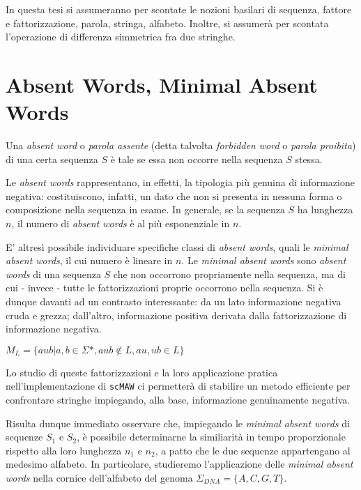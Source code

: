 In questa tesi si assumeranno per scontate le nozioni basilari di sequenza, fattore e fattorizzazione, parola, stringa, alfabeto. Inoltre, si assumerà per scontata l'operazione di differenza simmetrica fra due stringhe.

\section{Absent Words, Minimal Absent Words}

Una \textit{absent word} o \textit{parola assente} (detta talvolta \textit{forbidden word} o \textit{parola proibita}) di una certa sequenza $S$ è tale se essa non occorre nella sequenza $S$ stessa. 

Le \textit{absent words} rappresentano, in effetti, la tipologia più genuina di informazione negativa: costituiscono, infatti, un dato che non si presenta in nessuna forma o composizione nella sequenza in esame. In generale, se la sequenza $S$ ha lunghezza $n$, il numero di \textit{absent words} è al più esponenziale in $n$. 

\vspace{3mm}

E' altresì possibile individuare specifiche classi di \textit{absent words}, quali le \textit{minimal absent words}, il cui numero è lineare in $n$. Le \textit{minimal absent words} sono \textit{absent words} di una sequenza $S$ che non occorrono propriamente nella sequenza, ma di cui - invece - tutte le fattorizzazioni proprie occorrono nella sequenza. Si è dunque davanti ad un contrasto interessante: da un lato informazione negativa cruda e grezza; dall'altro, informazione positiva derivata dalla fattorizzazione di informazione negativa. 

\(M_L = \{aub | a,b \in \Sigma*, aub\not\in L, au,ub\in L\} \)

Lo studio di queste fattorizzazioni e la loro applicazione pratica nell'implementazione di \verb|scMAW| ci permetterà di stabilire un metodo efficiente per confrontare stringhe impiegando, alla base, informazione genuinamente negativa.

\vspace{3mm}

Risulta dunque immediato osservare che, impiegando le \textit{minimal absent words} di sequenze $S_1$ e $S_2$, è possibile determinarne la similiarità in tempo proporzionale rispetto alla loro lunghezza $n_1$ e $n_2$, a patto che le due sequenze appartengano al medesimo alfabeto. In particolare, studieremo l'applicazione delle\textit{ minimal absent words} nella cornice dell'alfabeto del genoma $\Sigma_{DNA} =\{A, C, G, T\}$.

